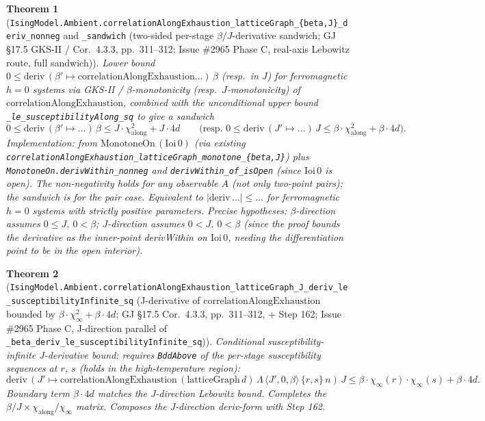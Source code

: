 \documentclass[a4paper,11pt]{article}
\newtheorem{theorem}{Theorem}
\begin{document}
\begin{theorem}[\texttt{IsingModel.Ambient.correlationAlongExhaustion\_latticeGraph\_\{beta,J\}\_deriv\_nonneg}
and \texttt{\_sandwich} (two-sided per-stage $\beta/J$-derivative sandwich; GJ \S17.5 GKS-II
/ Cor.~4.3.3, pp.~311--312; Issue \#2965 Phase C, real-axis Lebowitz route, full sandwich)]
Lower bound $0\le\mathrm{deriv}\,(\beta'\mapsto\mathrm{correlationAlongExhaustion}\dots)\,\beta$
(resp.\ in $J$) for ferromagnetic $h=0$ systems via GKS-II / $\beta$-monotonicity
(resp.\ $J$-monotonicity) of $\mathrm{correlationAlongExhaustion}$, combined with the
unconditional upper bound \texttt{\_le\_susceptibilityAlong\_sq} to give a sandwich
\[
  0 \le \mathrm{deriv}\,(\beta'\mapsto\dots)\,\beta
    \le J\cdot\chi_{\mathrm{along}}^2 + J\cdot 4d
  \qquad\text{(resp.\ }
  0\le \mathrm{deriv}\,(J'\mapsto\dots)\,J
    \le\beta\cdot\chi_{\mathrm{along}}^2+\beta\cdot 4d\text{)}.
\]
Implementation: from $\mathrm{MonotoneOn}\,(\mathrm{Ioi}\,0)$ (via existing
\texttt{correlationAlongExhaustion\_latticeGraph\_monotone\_\{beta,J\}}) plus
\texttt{MonotoneOn.derivWithin\_nonneg} and \texttt{derivWithin\_of\_isOpen} (since
$\mathrm{Ioi}\,0$ is open). The non-negativity holds for any observable $A$ (not only
two-point pairs); the sandwich is for the pair case. Equivalent to
$|\mathrm{deriv}\,\dots|\le\dots$ for ferromagnetic $h=0$ systems with strictly positive
parameters. Precise hypotheses: $\beta$-direction assumes $0\le J,\ 0<\beta$;
$J$-direction assumes $0<J,\ 0<\beta$ (since the proof bounds the derivative as the
inner-point derivWithin on $\mathrm{Ioi}\,0$, needing the differentiation point to be
in the open interior).
\end{theorem}

\begin{theorem}[\texttt{IsingModel.Ambient.correlationAlongExhaustion\_latticeGraph\_J\_deriv\_le\_susceptibilityInfinite\_sq}
(J-derivative of $\mathrm{correlationAlongExhaustion}$ bounded by
$\beta\cdot\chi_\infty^2 + \beta\cdot 4d$; GJ \S17.5 Cor.~4.3.3, pp.~311--312, + Step 162;
Issue \#2965 Phase C, J-direction parallel of \texttt{\_beta\_deriv\_le\_susceptibilityInfinite\_sq})]
Conditional susceptibility-infinite J-derivative bound: requires \texttt{BddAbove} of the
per-stage susceptibility sequences at $r$, $s$ (holds in the high-temperature region):
\[
  \mathrm{deriv}\,(J'\mapsto\mathrm{correlationAlongExhaustion}\,(\mathrm{latticeGraph}\,d)\,
        \Lambda\,\langle J',0,\beta\rangle\,\{r,s\}\,n)\,J
    \le \beta\cdot\chi_\infty(r)\cdot\chi_\infty(s) + \beta\cdot 4d.
\]
Boundary term $\beta\cdot 4d$ matches the J-direction Lebowitz bound. Completes the
$\beta/J\times\chi_{\mathrm{along}}/\chi_\infty$ matrix. Composes the J-direction deriv-form
with Step 162.
\end{theorem}
\end{document}
